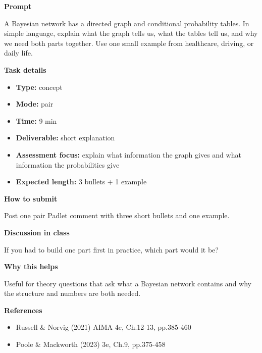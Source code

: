 \documentclass[11pt]{article}
\begin{document}
\begin{tcolorbox}[colback=white,colframe=MidnightBlue,title={Q1 Starter Intuition},fonttitle=\bfseries,breakable]
\begin{center}
\end{center}

{\large\bfseries\color{MidnightBlue} Prompt}\par\medskip
A Bayesian network has a directed graph and conditional probability tables. In simple language, explain what the graph tells us, what the tables tell us, and why we need both parts together. Use one small example from healthcare, driving, or daily life.

{\large\bfseries\color{MidnightBlue} Task details}\par\medskip
\begin{itemize}\item \textbf{Type:} concept
\item \textbf{Mode:} pair
\item \textbf{Time:} 9 min
\item \textbf{Deliverable:} short explanation
\item \textbf{Assessment focus:} explain what information the graph gives and what information the probabilities give
\item \textbf{Expected length:} 3 bullets + 1 example\end{itemize}

{\large\bfseries\color{MidnightBlue} How to submit}\par\medskip
Post one pair Padlet comment with three short bullets and one example.

{\large\bfseries\color{MidnightBlue} Discussion in class}\par\medskip
If you had to build one part first in practice, which part would it be?

{\large\bfseries\color{MidnightBlue} Why this helps}\par\medskip
Useful for theory questions that ask what a Bayesian network contains and why the structure and numbers are both needed.

{\large\bfseries\color{MidnightBlue} References}\par\medskip
\begin{itemize}\item Russell \& Norvig (2021) AIMA 4e, Ch.12-13, pp.385-460
\item Poole \& Mackworth (2023) 3e, Ch.9, pp.375-458\end{itemize}
\end{tcolorbox}
\end{document}
